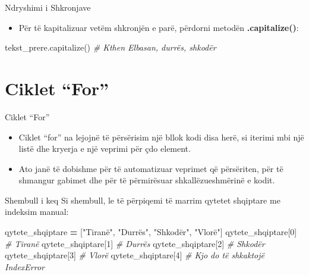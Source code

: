 \documentclass[
  ignorenonframetext,
]{beamer}
\newenvironment{Shaded}{\begin{snugshade}}{\end{snugshade}}
\newcommand{\CommentTok}[1]{\textcolor[rgb]{0.56,0.35,0.01}{\textit{#1}}}
\newcommand{\DecValTok}[1]{\textcolor[rgb]{0.00,0.00,0.81}{#1}}
\newcommand{\NormalTok}[1]{#1}
\newcommand{\OperatorTok}[1]{\textcolor[rgb]{0.81,0.36,0.00}{\textbf{#1}}}
\newcommand{\StringTok}[1]{\textcolor[rgb]{0.31,0.60,0.02}{#1}}
\providecommand{\tightlist}{%
  \setlength{\itemsep}{0pt}\setlength{\parskip}{0pt}}
\begin{document}
\begin{frame}[fragile]{Ndryshimi i Shkronjave}
\protect\hypertarget{ndryshimi-i-shkronjave}{}
\begin{itemize}
\tightlist
\item
  Për të kapitalizuar vetëm shkronjën e parë, përdorni metodën
  \textbf{.capitalize()}:
\end{itemize}

\begin{Shaded}
\begin{Highlighting}[]
\NormalTok{tekst\_prere.capitalize()  }\CommentTok{\# Kthen \textquotesingle{}Elbasan, durrës, shkodër\textquotesingle{}}
\end{Highlighting}
\end{Shaded}
\end{frame}

\hypertarget{ciklet-for}{%
\section*{Ciklet ``For''}\label{ciklet-for}}

\begin{frame}{Ciklet ``For''}
\protect\hypertarget{ciklet-for-1}{}
\begin{itemize}
\item
  Ciklet ``for'' na lejojnë të përsërisim një bllok kodi disa herë, si
  iterimi mbi një listë dhe kryerja e një veprimi për çdo element.
\item
  Ato janë të dobishme për të automatizuar veprimet që përsëriten, për
  të shmangur gabimet dhe për të përmirësuar shkallëzueshmërinë e kodit.
\end{itemize}
\end{frame}

\begin{frame}[fragile]{Shembull i keq}
\protect\hypertarget{shembull-i-keq}{}
Si shembull, le të përpiqemi të marrim qytetet shqiptare me indeksim
manual:

\begin{Shaded}
\begin{Highlighting}[]
\NormalTok{qytete\_shqiptare }\OperatorTok{=}\NormalTok{ [}\StringTok{"Tiranë"}\NormalTok{, }\StringTok{"Durrës"}\NormalTok{, }\StringTok{"Shkodër"}\NormalTok{, }\StringTok{"Vlorë"}\NormalTok{]}
\NormalTok{qytete\_shqiptare[}\DecValTok{0}\NormalTok{]  }\CommentTok{\# \textquotesingle{}Tiranë\textquotesingle{}}
\NormalTok{qytete\_shqiptare[}\DecValTok{1}\NormalTok{]  }\CommentTok{\# \textquotesingle{}Durrës\textquotesingle{}}
\NormalTok{qytete\_shqiptare[}\DecValTok{2}\NormalTok{]  }\CommentTok{\# \textquotesingle{}Shkodër\textquotesingle{}}
\NormalTok{qytete\_shqiptare[}\DecValTok{3}\NormalTok{]  }\CommentTok{\# \textquotesingle{}Vlorë\textquotesingle{}}
\NormalTok{qytete\_shqiptare[}\DecValTok{4}\NormalTok{]  }\CommentTok{\# Kjo do të shkaktojë IndexError}
\end{Highlighting}
\end{Shaded}
\end{frame}
\end{document}
